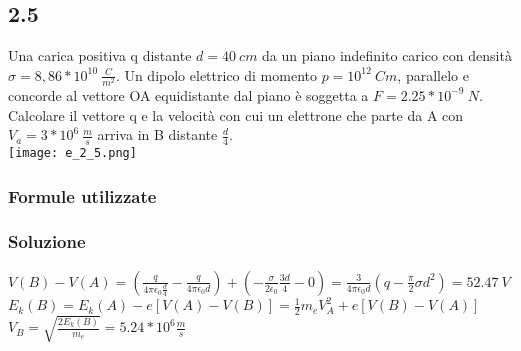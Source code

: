 \documentclass[../../main.tex]{subfiles}
\begin{document}
\subsection*{2.5}
Una carica positiva q distante $d = 40\ cm$ da un piano indefinito carico con densità $\sigma = 8,86 * 10^{10}\ \frac{C}{m^2}$.
Un dipolo elettrico di momento $p = 10^{12}\ Cm$, parallelo e concorde al vettore OA equidistante  dal piano è soggetta a $F=2.25 * 10^{-9}\ N$.
\\Calcolare il vettore q e la velocità con cui un elettrone che parte da A con $V_a = 3 * 10^6\ \frac{m}{s}$ arriva in B distante $\frac{d}{4}$.
\\\texttt{[image: e\_2\_5.png]}
\subsubsection*{Formule utilizzate}

\subsubsection*{Soluzione}
$V(B) - V(A) = \left(\frac{q}{4\pi\epsilon_0 \frac{d}{4}} - \frac{q}{4\pi\epsilon_0 d}\right) + \left(-\frac{\sigma}{2\epsilon_0}\frac{3d}{4}-0\right) = \frac{3}{4\pi\epsilon_0 d}\left(q - \frac{\pi}{2}\sigma d^2\right) = 52.47\ V$
\\$E_k(B) = E_k(A)-e[V(A) - V(B)] = \frac{1}{2}m_eV_A^2 + e[V(B) -V(A)]$
\\$V_B = \sqrt{\frac{2E_k(B)}{m_e}} = 5.24 * 10^6\frac{m}{s}$
\newpage
\end{document}
